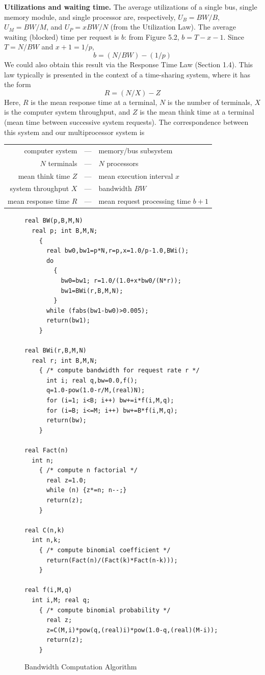 \noindent\textbf{Utilizations and waiting time.} The average utilizations of a single bus,
single memory module, and single processor are, respectively, $U_B=BW/B$,
$U_M=BW/M$, and $U_P=xBW/N$ (from the Utilization Law). The average
waiting (blocked) time per request is $b$: from Figure 5.2, $b=T-x-1$. Since
$T=N/BW$ and $x+1=1/p$,
\begin{equation}
b=(N/BW)-(1/p)
\end{equation}
We could also obtain this result via the Response Time Law (Section 1.4).
This law typically is presented in the context of a time-sharing system,
where it has the form
\begin{equation}
R=(N/X)-Z
\end{equation}
Here, $R$ is the mean response time at a terminal, $N$ is the number of
terminals, $X$ is the computer system throughput, and $Z$ is the mean think
time at a terminal (mean time between successive system requests). The
correspondence between this system and our multiprocessor system is
\begin{center}
\begin{tabular}{rcl}
computer system & --- & memory/bus subsystem \\
$N$ terminals & --- & $N$ processors \\
mean think time $Z$ & --- & mean execution interval $x$ \\
system throughput $X$ & --- & bandwidth $BW$ \\
mean response time $R$ & --- & mean request processing time $b+1$
\end{tabular}
\end{center}
\begin{figure}[H]
\centering
\begin{minipage}{.92\textwidth}
\begin{lstlisting}[basicstyle=\ttfamily\scriptsize]
real BW(p,B,M,N)
  real p; int B,M,N;
    {
      real bw0,bw1=p*N,r=p,x=1.0/p-1.0,BWi();
      do
        {
          bw0=bw1; r=1.0/(1.0+x*bw0/(N*r));
          bw1=BWi(r,B,M,N);
        }
      while (fabs(bw1-bw0)>0.005);
      return(bw1);
    }

real BWi(r,B,M,N)
  real r; int B,M,N;
    { /* compute bandwidth for request rate r */
      int i; real q,bw=0.0,f();
      q=1.0-pow(1.0-r/M,(real)N);
      for (i=1; i<B; i++) bw+=i*f(i,M,q);
      for (i=B; i<=M; i++) bw+=B*f(i,M,q);
      return(bw);
    }

real Fact(n)
  int n;
    { /* compute n factorial */
      real z=1.0;
      while (n) {z*=n; n--;}
      return(z);
    }

real C(n,k)
  int n,k;
    { /* compute binomial coefficient */
      return(Fact(n)/(Fact(k)*Fact(n-k)));
    }

real f(i,M,q)
  int i,M; real q;
    { /* compute binomial probability */
      real z;
      z=C(M,i)*pow(q,(real)i)*pow(1.0-q,(real)(M-i));
      return(z);
    }
\end{lstlisting}
\end{minipage}
\caption{Bandwidth Computation Algorithm}
\end{figure}
